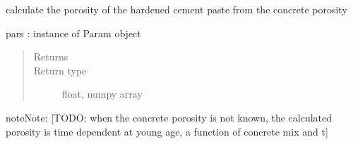 \documentclass[letterpaper,10pt,english]{sphinxmanual}
\begin{document}
\begin{fulllineitems}
\label{\detokenize{corrosion:corrosion.epsilon_p_f}}
\sphinxAtStartPar
calculate the porosity of the hardened cement paste from the concrete porosity

\sphinxAtStartPar
pars : instance of Param object
\begin{quote}\begin{description}
\item[{Returns}] \leavevmode
\sphinxAtStartPar


\item[{Return type}] \leavevmode
\sphinxAtStartPar
float, numpy array

\end{description}\end{quote}

\begin{sphinxadmonition}{note}{Note:}
\sphinxAtStartPar
{[}TODO: when the concrete porosity is not known, the calculated porosity is time dependent at young age, a function of concrete mix and t{]}
\end{sphinxadmonition}

\end{fulllineitems}

\end{document}
